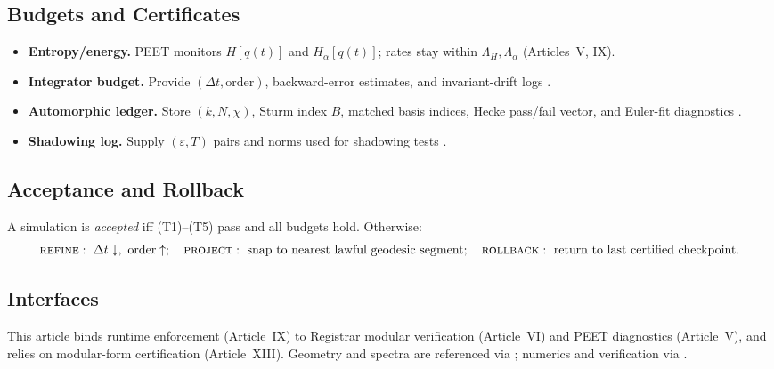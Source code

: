 \documentclass[12pt]{amsart}
\theoremstyle{plain}
\begin{document}
\subsection{Budgets and Certificates}
\begin{itemize}
  \item \textbf{Entropy/energy.} PEET monitors $H[q(t)]$ and $H_\alpha[q(t)]$; rates stay within $\Lambda_H,\Lambda_\alpha$ (Articles~V, IX).
  \item \textbf{Integrator budget.} Provide $(\Delta t,\text{order})$, backward-error estimates, and invariant-drift logs \cite{hairer2006geometric}.
  \item \textbf{Automorphic ledger.} Store $(k,N,\chi)$, Sturm index $B$, matched basis indices, Hecke pass/fail vector, and Euler-fit diagnostics \cite{sturm1987congruence,diamond2005first}.
  \item \textbf{Shadowing log.} Supply $(\varepsilon,T)$ pairs and norms used for shadowing tests \cite{pilyugin1999shadowing}.
\end{itemize}

\subsection{Acceptance and Rollback}
A simulation is \emph{accepted} iff (T1)–(T5) pass and all budgets hold. Otherwise:
\[
\textsc{refine}:\ \Delta t\downarrow,\ \text{order}\uparrow;\quad
\textsc{project}:\ \text{snap to nearest lawful geodesic segment};\quad
\textsc{rollback}:\ \text{return to last certified checkpoint.}
\]

\subsection{Interfaces}
This article binds runtime enforcement (Article~IX) to Registrar modular verification (Article~VI) and PEET diagnostics (Article~V), and relies on modular-form certification (Article~XIII). Geometry and spectra are referenced via \cite{katok1992fuchsian,iwaniec2002spectral}; numerics and verification via \cite{trotter1959product,suzuki1976generalized,hairer2006geometric,pilyugin1999shadowing,clarke1999model,baier2008model}.

\appendix
\newpage
\end{document}
